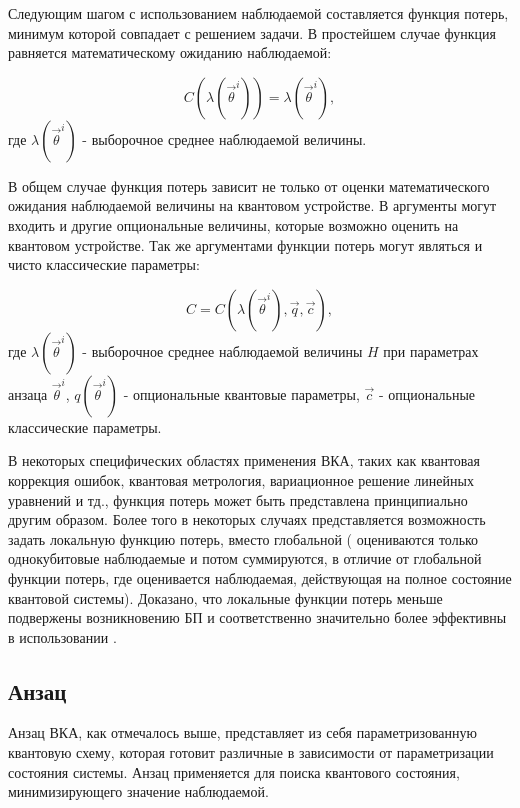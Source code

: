 \documentclass[14pt]{extarticle}
\begin{document}
\qquad Следующим шагом с использованием наблюдаемой составляется функция потерь, минимум которой совпадает с решением задачи. В простейшем случае функция равняется математическому ожиданию наблюдаемой:

\begin{equation}
 C(\lambda(\vec{\theta}^i)) = \lambda(\vec{\theta}^i),
\end{equation}  где $\lambda(\vec{\theta}^i)$ - выборочное среднее наблюдаемой величины.

\qquad В общем случае функция потерь зависит не только от оценки математического ожидания наблюдаемой величины на квантовом устройстве. В аргументы могут входить и другие опциональные величины, которые возможно оценить на квантовом устройстве. Так же аргументами функции потерь могут являться и чисто классические параметры:

\begin{equation}
C = C(\lambda(\vec{\theta}^i), \vec{q}, \vec{c}),
\end{equation} где $\lambda(\vec{\theta}^i)$ - выборочное среднее наблюдаемой величины $H$ при параметрах анзаца $\vec{\theta}^i$, $q(\vec{\theta}^i)$ - опциональные квантовые параметры, $\vec{c}$ - опциональные классические параметры.

\qquad В некоторых специфических областях применения ВКА, таких как квантовая коррекция ошибок, квантовая метрология, вариационное решение линейных уравнений и тд., функция потерь может быть представлена принципиально другим образом. Более того в некоторых случаях представляется возможность задать локальную функцию потерь, вместо глобальной ( оцениваются только однокубитовые наблюдаемые и потом суммируются, в отличие от глобальной функции потерь, где оценивается наблюдаемая, действующая на полное состояние квантовой системы). Доказано, что локальные функции потерь меньше подвержены возникновению БП и соответственно значительно более эффективны в использовании \cite{Cost_func_and_landscape}.

\subsection{Анзац}

\qquad Анзац ВКА, как отмечалось выше, представляет из себя параметризованную квантовую схему, которая готовит различные в зависимости от параметризации состояния системы. Анзац применяется для поиска квантового состояния, минимизирующего значение наблюдаемой. 
\end{document}
